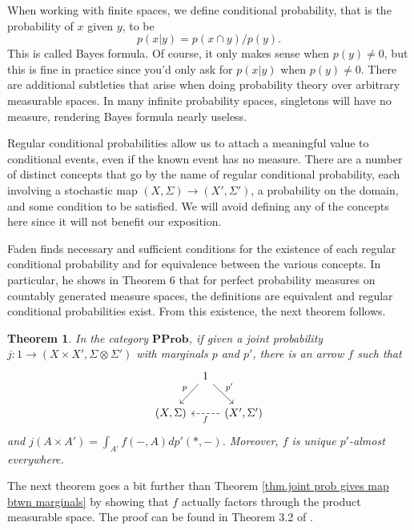 \documentclass[11pt]{amsart}
\newcommand{\cat}[1]{\mathbf{#1}}
\newcommand{\from}{\colon}
\newtheorem{thm}{Theorem}[section]
\theoremstyle{remark}
\theoremstyle{definition}
\begin{document}
When working with finite spaces, we define 
conditional probability, that is the 
probability of $x$ given $y$, to be
\[
p(x|y) = p(x \cap y)/p(y).
\]
This is called Bayes formula.  Of course, it 
only makes sense when $p(y) \neq 
0$, but this is fine in practice since you'd 
only ask for $p(x|y)$ when $p(y) 
\neq 0$. There are additional subtleties that 
arise when doing probability 
theory over arbitrary measurable spaces. In 
many infinite probability spaces, 
singletons will have no measure, rendering 
Bayes formula nearly useless. 

Regular conditional probabilities allow us to 
attach a meaningful value 
to conditional events, even if the known event 
has no measure. There are a 
number of distinct concepts that go by the 
name of regular conditional 
probability, each involving a stochastic map 
$(X,\Sigma) \to (X',\Sigma')$, a 
probability on the domain, and some condition 
to be satisfied. We will avoid 
defining any of the concepts here since it 
will not benefit our exposition.  

Faden \cite{Faden_ExistRegCondProbs} finds 
necessary and sufficient conditions 
for the existence of each regular conditional 
probability and for equivalence 
between the various concepts.  In particular, 
he shows in Theorem 6 that for 
perfect probability measures on countably 
generated measure spaces, the 
definitions are equivalent and regular 
conditional probabilities exist. From 
this existence, the next theorem follows.

\begin{thm} \label{thm.joint prob gives map btwn marginals}
In the category $\cat{PProb}$, if given a 
joint probability $j \from 1 \to (X 
\times X',\Sigma \otimes \Sigma')$ with 
marginals $p$ and $p'$, there is an 
arrow $f$ such that
\[
\begin{tikzcd}[column sep=tiny]
{} & {1} \ar[dl,swap,"p"] \ar[dr,"p'"] & {} \\
{(X,\Sigma)} & {} & {(X',\Sigma')} \ar[ll,dashed,"f" ]
\end{tikzcd}
\]
and $j(A \times A') = \int_{A'}f(-,A)dp'(\ast,-)$.	Moreover, $f$ is unique $p'$-almost everywhere.
\end{thm}
 
The next theorem goes a bit further than 
Theorem \ref{thm.joint prob gives map 
btwn marginals} by showing that $f$ actually 
factors through the product 
measurable space.  The proof can be found in 
Theorem 3.2 of 
\cite{CulbSturtz_CategoricalBayesProb}.
\end{document}
